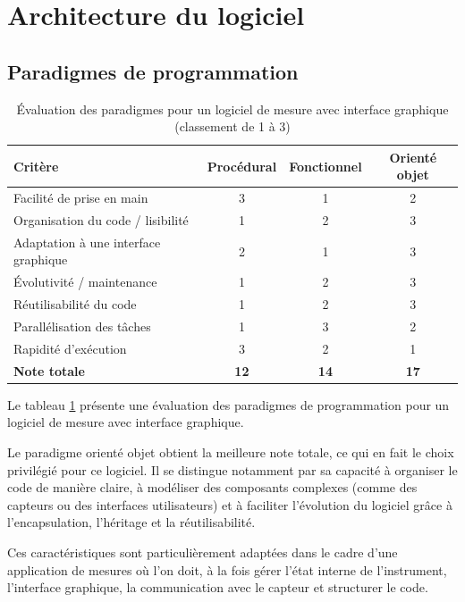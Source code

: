 \section{Architecture du logiciel}
\subsection{Paradigmes de programmation}

\begin{table}[H]
    \centering
    \begin{tabular}{|l|c|c|c|}
        \hline
        \textbf{Critère} & \textbf{Procédural} & \textbf{Fonctionnel} & \textbf{Orienté objet} \\
        \hline
        Facilité de prise en main & 3 & 1 & 2 \\
        Organisation du code / lisibilité & 1 & 2 & 3 \\
        Adaptation à une interface graphique & 2 & 1 & 3 \\
        Évolutivité / maintenance & 1 & 2 & 3 \\
        Réutilisabilité du code & 1 & 2 & 3 \\
        Parallélisation des tâches & 1 & 3 & 2 \\
        Rapidité d'exécution & 3 & 2 & 1 \\
        \hline
        \textbf{Note totale} & \textbf{12} & \textbf{14} & \textbf{17} \\
        \hline
    \end{tabular}
    \caption{Évaluation des paradigmes pour un logiciel de mesure avec interface graphique (classement de 1 à 3)}
    \label{tab:comparatif_paradigmes}
\end{table}

Le tableau \ref{tab:comparatif_paradigmes} présente une évaluation des paradigmes de programmation pour un logiciel de mesure avec interface graphique.

Le paradigme orienté objet obtient la meilleure note totale, ce qui en fait le choix privilégié pour ce logiciel. Il se distingue notamment par sa capacité à organiser le code de manière claire, à modéliser des composants complexes (comme des capteurs ou des interfaces utilisateurs) et à faciliter l’évolution du logiciel grâce à l’encapsulation, l’héritage et la réutilisabilité.

Ces caractéristiques sont particulièrement adaptées dans le cadre d'une application de mesures où l’on doit, à la fois gérer l’état interne de l’instrument, l’interface graphique, la communication avec le capteur et structurer le code.

